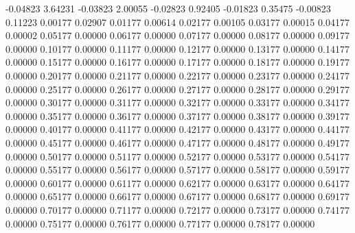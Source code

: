      -0.04823      3.64231    
     -0.03823      2.00055    
     -0.02823      0.92405    
     -0.01823      0.35475    
     -0.00823      0.11223    
      0.00177      0.02907    
      0.01177      0.00614    
      0.02177      0.00105    
      0.03177      0.00015    
      0.04177      0.00002    
      0.05177      0.00000    
      0.06177      0.00000    
      0.07177      0.00000    
      0.08177      0.00000    
      0.09177      0.00000    
      0.10177      0.00000    
      0.11177      0.00000    
      0.12177      0.00000    
      0.13177      0.00000    
      0.14177      0.00000    
      0.15177      0.00000    
      0.16177      0.00000    
      0.17177      0.00000    
      0.18177      0.00000    
      0.19177      0.00000    
      0.20177      0.00000    
      0.21177      0.00000    
      0.22177      0.00000    
      0.23177      0.00000    
      0.24177      0.00000    
      0.25177      0.00000    
      0.26177      0.00000    
      0.27177      0.00000    
      0.28177      0.00000    
      0.29177      0.00000    
      0.30177      0.00000    
      0.31177      0.00000    
      0.32177      0.00000    
      0.33177      0.00000    
      0.34177      0.00000    
      0.35177      0.00000    
      0.36177      0.00000    
      0.37177      0.00000    
      0.38177      0.00000    
      0.39177      0.00000    
      0.40177      0.00000    
      0.41177      0.00000    
      0.42177      0.00000    
      0.43177      0.00000    
      0.44177      0.00000    
      0.45177      0.00000    
      0.46177      0.00000    
      0.47177      0.00000    
      0.48177      0.00000    
      0.49177      0.00000    
      0.50177      0.00000    
      0.51177      0.00000    
      0.52177      0.00000    
      0.53177      0.00000    
      0.54177      0.00000    
      0.55177      0.00000    
      0.56177      0.00000    
      0.57177      0.00000    
      0.58177      0.00000    
      0.59177      0.00000    
      0.60177      0.00000    
      0.61177      0.00000    
      0.62177      0.00000    
      0.63177      0.00000    
      0.64177      0.00000    
      0.65177      0.00000    
      0.66177      0.00000    
      0.67177      0.00000    
      0.68177      0.00000    
      0.69177      0.00000    
      0.70177      0.00000    
      0.71177      0.00000    
      0.72177      0.00000    
      0.73177      0.00000    
      0.74177      0.00000    
      0.75177      0.00000    
      0.76177      0.00000    
      0.77177      0.00000    
      0.78177      0.00000    
